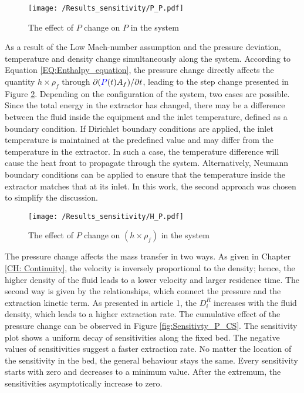 \documentclass[../Article_Model_Parameters.tex]{subfiles}
\begin{document}
    \begin{figure}[h!]
    	\centering
    	\texttt{[image: /Results\_sensitivity/P\_P.pdf]}
    	\caption{The effect of $P$ change on $P$ in the system}
    	\label{fig:Sensitivty_P_P}
    \end{figure}
    
	As a result of the Low Mach-number assumption and the pressure deviation, temperature and density change simultaneously along the system. According to Equation \ref{EQ:Enthalpy_equation}, the pressure change directly affects the quantity $h \times \rho_f$ through $\partial ({\color{blue}P}(t) A_f) / \partial t$, leading to the step change presented in Figure \ref{fig:Sensitivty_P_H}. Depending on the configuration of the system, two cases are possible. Since the total energy in the extractor has changed, there may be a difference between the fluid inside the equipment and the inlet temperature, defined as a boundary condition. If Dirichlet boundary conditions are applied, the inlet temperature is maintained at the predefined value and may differ from the temperature in the extractor. In such a case, the temperature difference will cause the heat front to propagate through the system. Alternatively, Neumann boundary conditions can be applied to ensure that the temperature inside the extractor matches that at its inlet. In this work, the second approach was chosen to simplify the discussion.
    
    \begin{figure}[h!]
    	\centering
    	\texttt{[image: /Results\_sensitivity/H\_P.pdf]}
    	\caption{The effect of $P$ change on $(h \times \rho_f)$ in the system}
    	\label{fig:Sensitivty_P_H}
    \end{figure}

	The pressure change affects the mass transfer in two ways. As given in Chapter \ref{CH: Continuity}, the velocity is inversely proportional to the density; hence, the higher density of the fluid leads to a lower velocity and larger residence time. The second way is given by the relationships, which connect the pressure and the extraction kinetic term. As presented in {\color{red}article 1}, the $D_i^R$ increases with the fluid density, which leads to a higher extraction rate. The cumulative effect of the pressure change can be observed in Figure \ref{fig:Sensitivty_P_CS}. The sensitivity plot shows a uniform decay of sensitivities along the fixed bed. The negative values of sensitivities suggest a faster extraction rate. No matter the location of the sensitivity in the bed, the general behaviour stays the same. Every sensitivity starts with zero and decreases to a minimum value. After the extremum, the sensitivities asymptotically increase to zero.
\end{document}

